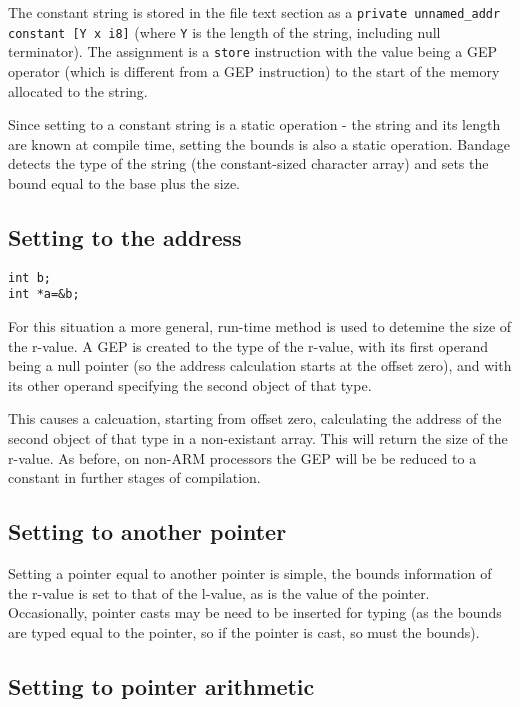 The constant string is stored in the file text section as a \verb!private unnamed_addr constant [Y x i8]! (where \verb!Y! is the length of the string, including null terminator).
The assignment is a \verb!store! instruction with the value being a GEP operator (which is different from a GEP instruction) to the start of the memory allocated to the string.

Since setting to a constant string is a static operation - the string and its length are known at compile time, setting the bounds is also a static operation.
Bandage detects the type of the string (the constant-sized character array) and sets the bound equal to the base plus the size.

\subsection{Setting to the address}

\begin{verbatim}
int b;
int *a=&b;
\end{verbatim}

For this situation a more general, run-time method is used to detemine the size of the r-value.
A GEP is created to the type of the r-value, with its first operand being a null pointer (so the address calculation starts at the offset zero), and with its other operand specifying the second object of that type.

This causes a calcuation, starting from offset zero, calculating the address of the second object of that type in a non-existant array.
This will return the size of the r-value.
As before, on non-ARM processors the GEP will be be reduced to a constant in further stages of compilation.

\subsection{Setting to another pointer}

Setting a pointer equal to another pointer is simple, the bounds information of the r-value is set to that of the l-value, as is the value of the pointer.
Occasionally, pointer casts may be need to be inserted for typing (as the bounds are typed equal to the pointer, so if the pointer is cast, so must the bounds).

\subsection{Setting to pointer arithmetic}

